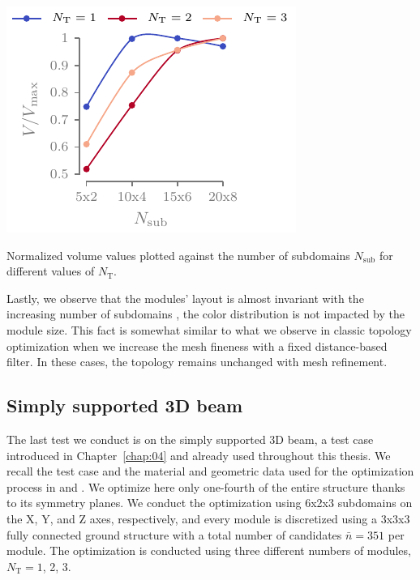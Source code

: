 \begin{marginfigure}
    \centering
    \includegraphics{figures/06_DMO/00_tug_bench_crv2/vol.pdf}
    \caption{Normalized volume values plotted against the number of subdomains $N_\text{sub}$ for different values of $N_\text{T}$.}
    \label{fig:06_cant_volume_norm_2}
\end{marginfigure}

Lastly, we observe that the modules' layout is almost invariant with the increasing number of subdomains \ie, the color distribution is not impacted by the module size. This fact is somewhat similar to what we observe in classic topology optimization when we increase the mesh fineness with a fixed distance-based filter. In these cases, the topology remains unchanged with mesh refinement.

\subsection{Simply supported 3D beam}
The last test we conduct is on the simply supported 3D beam, a test case introduced in Chapter~\ref{chap:04} and already used throughout this thesis. We recall the test case and the material and geometric data used for the optimization process in  and . We optimize here only one-fourth of the entire structure thanks to its symmetry planes. We conduct the optimization using 6x2x3 subdomains on the X, Y, and Z axes, respectively, and every module is discretized using a 3x3x3 fully connected ground structure with a total number of candidates $\bar{n} = 351$ per module. The optimization is conducted using three different numbers of modules, $N_\text{T}=1$, 2, 3.

